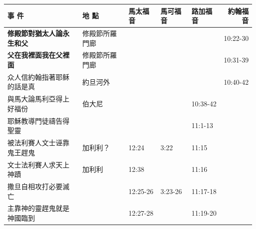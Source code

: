 \begin{table}[H]
  \centering 
    \begin{tabular}{p{13.07em}|l|l|l|p{5.285em}|r}
    \toprule
    \textbf{事 件} & \multicolumn{1}{p{7.93em}|}{\textbf{地 點}} & \multicolumn{1}{p{5.285em}|}{\textbf{馬太福音}} & \multicolumn{1}{p{5.57em}|}{\textbf{馬可福音}} & \textbf{路加福音} & \multicolumn{1}{p{4.855em}}{\textbf{約翰福音}} \\\midrule 



 \textbf{修殿節對猶太人論永生和父} & \multicolumn{1}{p{7.93em}|}{修殿節所羅門廊} &       &       & \multicolumn{1}{r|}{} & \multicolumn{1}{p{4.855em}}{10:22-30} \\\midrule

\textbf{父在我裡面我在父裡面} & \multicolumn{1}{p{7.93em}|}{修殿節所羅門廊} &       &       & \multicolumn{1}{r|}{} & \multicolumn{1}{p{4.855em}}{10:31-39} \\\midrule

众人信約翰指著耶稣的話是真& \multicolumn{1}{p{7.93em}|}{約旦河外} & \multicolumn{1}{p{5.285em}|}{} && &\multicolumn{1}{p{4.855em}}{10:40-42} \\\midrule

與馬大論馬利亞得上好福份 & \multicolumn{1}{p{7.93em}|}{伯大尼} &       &       & 10:38-42 &  \\ \midrule

耶穌教導門徒禱告得聖靈 &       &       &       & 11:1-13 &  \\\midrule


被法利賽人文士诬靠鬼王趕鬼&\multicolumn{1}{l|}{加利利？}& 12:24& 3:22& 11:15 & \\ \midrule

文士法利賽人求天上神蹟&\multicolumn{1}{l|}{加利利}&12:38&  & 11:16 & \\ \midrule


撒旦自相攻打必要滅亡&\multicolumn{1}{l|}{}& 12:25-26& 3:23-26& 11:17-18& \\ \midrule

主靠神的靈趕鬼就是神國臨到&\multicolumn{1}{l|}{}& 12:27-28&& 11:19-20& \\ \midrule


\end{tabular}
\end{table}
